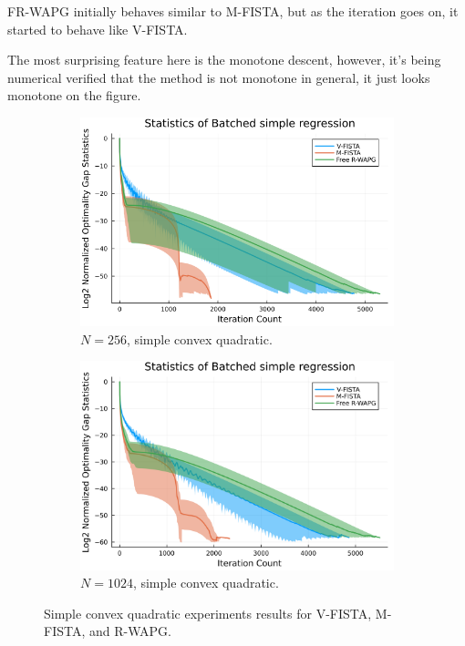 \documentclass[12pt]{article}
\begin{document}
            FR-WAPG initially behaves similar to M-FISTA, but as the iteration goes on, it started to behave like V-FISTA.  
            \par 
            The most surprising feature here is the monotone descent, however, it's being numerical verified that the method is not monotone in general, it just looks monotone on the figure. 
            \begin{figure}[H]
                \begin{subfigure}[b]{0.47\textwidth}
                    \centering
                    \includegraphics[width=\textwidth]{assets/simple_regression_batched-256.png}
                    \caption{$N = 256$, simple convex quadratic.}
                \end{subfigure}
                \hfill
                \begin{subfigure}[b]{0.47\textwidth}
                    \centering
                    \includegraphics[width=\textwidth]{assets/simple_regression_batched-1024.png}
                    \caption{$N = 1024$, simple convex quadratic. }
                \end{subfigure}
                \caption{Simple convex quadratic experiments results for V-FISTA, M-FISTA, and R-WAPG. }
                \label{fig:simple-quadratic-NOG}
            \end{figure}
\end{document}

